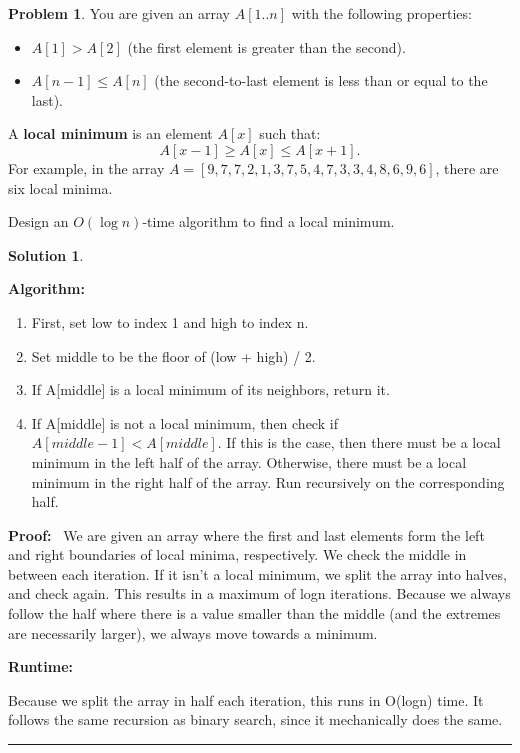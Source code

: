 \documentclass{article}
\theoremstyle{definition}
\newtheorem{problem}{Problem}
\def\fline{\rule{0.75\linewidth}{0.5pt}}
\newcommand{\finishline}{
  \begin{center}\fline
\end{center}}
\newtheorem*{solution*}{Solution}
\newenvironment{solution}{
\begin{solution*}}{{\finishline}
\end{solution*}}
\begin{document}
\begin{problem}
  You are given an array \( A[1..n] \) with the following properties:
  \begin{itemize}
    \item \( A[1] > A[2] \) (the first element is greater than the second).
    \item \( A[n-1] \leq A[n] \) (the second-to-last element is less than or equal to the last).
  \end{itemize}

  A \textbf{local minimum} is an element \( A[x] \) such that:
  \[
    A[x-1] \geq A[x] \leq A[x+1].
  \]
  For example, in the array \( A = [9, 7, 7, 2, 1, 3, 7, 5, 4, 7, 3, 3, 4, 8, 6, 9, 6] \), there are six local minima.

  Design an \( O(\log n) \)-time algorithm to find a local minimum.

\end{problem}
\begin{solution}
  \

  \textbf{Algorithm:}
  \
  \begin{enumerate}
    \item First, set low to index 1 and high to index n.
    \item Set middle to be the floor of (low + high) / 2.
    \item If A[middle] is a local minimum of its neighbors, return it.
    \item If A[middle] is not a local minimum, then check if $A[middle-1] < A[middle]$. If this is the case, then there must be a local minimum in the left half of the array. Otherwise, there must be a local minimum in the right half of the array. Run recursively on the corresponding half.
  \end{enumerate}
  \textbf{Proof:}
  \
  We are given an array where the first and last elements form the left and right boundaries of local minima, respectively. We check the middle in between each iteration. If it isn't a local minimum, we split the array into halves, and check again. This results in a maximum of logn iterations. Because we always follow the half where there is a value smaller than the middle (and the extremes are necessarily larger), we always move towards a minimum.

  \textbf{Runtime:}
  \

  Because we split the array in half each iteration, this runs in O(logn) time. It follows the same recursion as binary search, since it mechanically does the same.
\end{solution}
\end{document}
